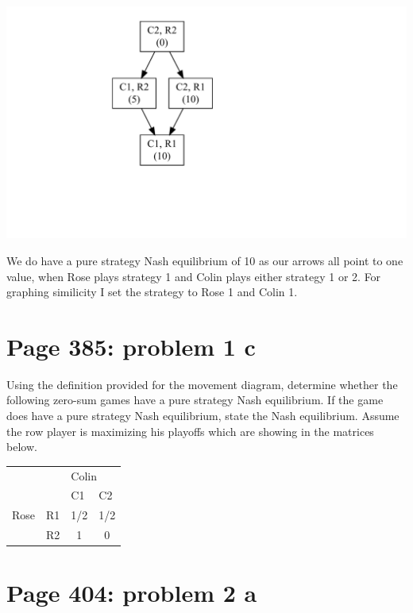 \documentclass[]{article}
\begin{document}
\includegraphics{Christophe_Hunt_hw9_files/figure-latex/unnamed-chunk-1-1.pdf}

We do have a pure strategy Nash equilibrium of 10 as our arrows all
point to one value, when Rose plays strategy 1 and Colin plays either
strategy 1 or 2. For graphing similicity I set the strategy to Rose 1
and Colin 1.

\newpage

\section{Page 385: problem 1 c}\label{page-385-problem-1-c}

Using the definition provided for the movement diagram, determine
whether the following zero-sum games have a pure strategy Nash
equilibrium. If the game does have a pure strategy Nash equilibrium,
state the Nash equilibrium. Assume the row player is maximizing his
playoffs which are showing in the matrices below.

\begin{table}[!h]
\centering
\begin{tabular}{lllc}
 &  & \multicolumn{2}{l}{Colin} \\ \cline{3-4}
 &  & C1 & \multicolumn{1}{l}{C2} \\ \hline
Rose & R1 & \multicolumn{1}{c}{1/2} & 1/2 \\
 & R2 & \multicolumn{1}{c}{1} & 0 \\ \hline
\end{tabular}
\end{table}

\section{Page 404: problem 2 a}\label{page-404-problem-2-a}
\end{document}
